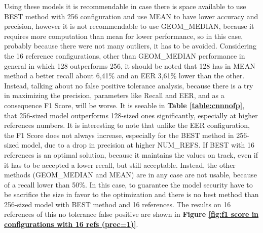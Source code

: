 Using these models it is recommendable in case there is space available to use BEST method with 256 configuration and use MEAN to have lower accuracy and precision, however it is not recommendable to use GEOM\_MEDIAN, because it requires more computation than mean for lower performance, so in this case, probably because there were not many outliers, it has to be avoided. Considering the 16 reference configurations, other than GEOM\_MEDIAN performance in general in which 128 outperforms 256, it should be noted that 128 has in MEAN method a better recall about 6,41\% and an EER 3,61\% lower than the other. Instead, talking about no false positive tolerance analysis, because there is a try in maximizing the precision, parameters like Recall and EER, and as a consequence F1 Score, will be worse. It is seeable in \textbf{Table \ref{table:cnnnofp}}, that 256-sized model outperforms 128-sized ones significantly, especially at higher references numbers. It is interesting to note that unlike the EER configuration, the F1 Score does not always increase, especially for the BEST method in 256-sized model, due to a drop in precision at higher NUM\_REFS. If BEST with 16 references is an optimal solution, because it maintains the values on track, even if it has to be accepted a lower recall, but still acceptable. Instead, the other methods (GEOM\_MEDIAN and MEAN) are in any case are not usable, because of a recall lower than 50\%. In this case, to guarantee the model security have to be sacrifice the size in favor to the optimization and there is no best method than 256-sized model with BEST method and 16 references. The results on 16 references of this no tolerance false positive are shown in \textbf{Figure \ref{fig:f1 score in configurations with 16 refs (prec=1)}}.
